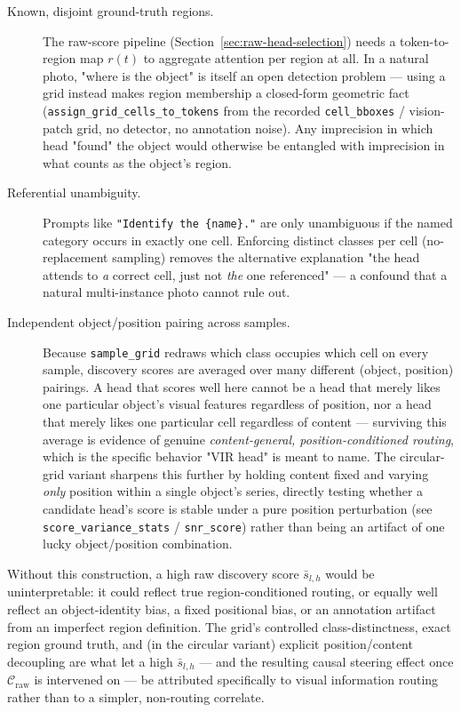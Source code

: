 \begin{description}
  \item[Known, disjoint ground-truth regions.] The raw-score pipeline
  (Section~\ref{sec:raw-head-selection}) needs a token-to-region map
  $r(t)$ to aggregate attention per region at all. In a natural photo, "where
  is the object" is itself an open detection problem — using a grid instead
  makes region membership a closed-form geometric fact
  (\texttt{assign\_grid\_cells\_to\_tokens} from the recorded \texttt{cell\_bboxes}
  / vision-patch grid, no detector, no annotation noise). Any imprecision in
  which head "found" the object would otherwise be entangled with imprecision
  in what counts as the object's region.
  \item[Referential unambiguity.] Prompts like \texttt{"Identify the
  \{name\}."} are only unambiguous if the named category occurs in exactly
  one cell. Enforcing distinct classes per cell (no-replacement sampling)
  removes the alternative explanation "the head attends to \emph{a} correct
  cell, just not \emph{the} one referenced" — a confound that a natural
  multi-instance photo cannot rule out.
  \item[Independent object/position pairing across samples.] Because
  \texttt{sample\_grid} redraws which class occupies which cell on every
  sample, discovery scores are averaged over many different
  (object, position) pairings. A head that scores well here cannot be a head
  that merely likes one particular object's visual features regardless of
  position, nor a head that merely likes one particular cell regardless of
  content — surviving this average is evidence of genuine
  \emph{content-general, position-conditioned routing}, which is the specific
  behavior "VIR head" is meant to name. The circular-grid variant sharpens
  this further by holding content fixed and varying \emph{only} position
  within a single object's series, directly testing whether a candidate
  head's score is stable under a pure position perturbation (see
  \texttt{score\_variance\_stats} / \texttt{snr\_score}) rather than being an
  artifact of one lucky object/position combination.
\end{description}

Without this construction, a high raw discovery score $\bar{s}_{l,h}$ would
be uninterpretable: it could reflect true region-conditioned routing, or
equally well reflect an object-identity bias, a fixed positional bias, or an
annotation artifact from an imperfect region definition. The grid's controlled
class-distinctness, exact region ground truth, and (in the circular variant)
explicit position/content decoupling are what let a high $\bar{s}_{l,h}$ — and
the resulting causal steering effect once $\mathcal{C}_{\text{raw}}$ is
intervened on — be attributed specifically to visual information routing
rather than to a simpler, non-routing correlate.

